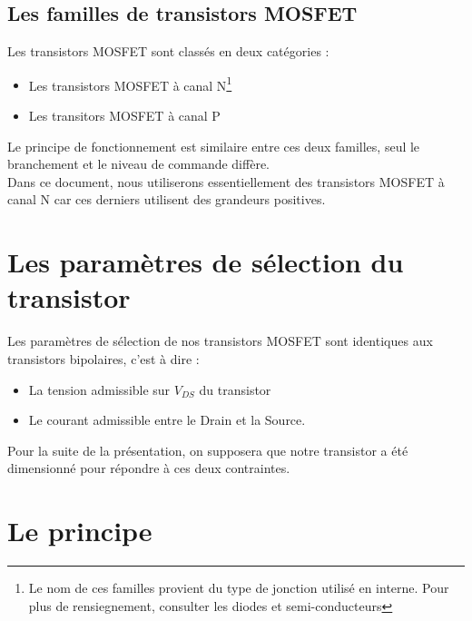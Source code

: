     \subsection{Les familles de transistors MOSFET}

     Les transistors MOSFET sont classés en deux catégories : 
     
     \begin{itemize}
     
       \item Les transistors MOSFET à canal N\footnote{Le nom de ces familles provient du type de jonction utilisé en interne. Pour plus de rensiegnement, consulter les diodes et semi-conducteurs}
       \item Les transitors MOSFET à canal P
     
     \end{itemize}
     
     Le principe de fonctionnement est similaire entre ces deux familles, seul le branchement et le niveau de commande diffère.\\
     Dans ce document, nous utiliserons essentiellement des transistors MOSFET à canal N car ces derniers utilisent des grandeurs positives.
     

     \section{Les paramètres de sélection du transistor}
     
     Les paramètres de sélection de nos transistors MOSFET sont identiques aux transistors bipolaires, c'est à dire :
     
     \begin{itemize}
     
       \item La tension admissible sur $V_{DS}$ du transistor
       \item Le courant admissible entre le Drain et la Source.
     \end{itemize}
     
     Pour la suite de la présentation, on supposera que notre transistor a été dimensionné pour répondre à ces deux contraintes.


     \section{Le principe}

